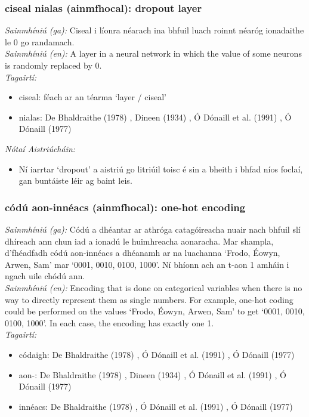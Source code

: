 \documentclass{article}
\begin{document}
\subsubsection*{ciseal nialas (ainmfhocal): dropout layer}
 \noindent \textit{Sainmhíniú (ga):} Ciseal i líonra néarach ina bhfuil luach roinnt néaróg ionadaithe le 0 go randamach.
\\
 \noindent \textit{Sainmhíniú (en):} A layer in a neural network in which the value of some neurons is randomly replaced by 0.
\\
 \noindent \textit{Tagairtí:}
\begin{itemize}
	\item ciseal: féach ar an téarma `layer / ciseal'
	\item nialas: De Bhaldraithe (1978) \cite{de-bhaldraithe}, Dineen (1934) \cite{dineen}, Ó Dónaill et al. (1991) \cite{focloir-beag}, Ó Dónaill (1977) \cite{odonaill}
\end{itemize}

 \noindent \textit{Nótaí Aistriúcháin:}
\begin{itemize}
	\item Ní iarrtar `dropout' a aistriú go litriúil toisc é sin a bheith i bhfad níos foclaí, gan buntáiste léir ag baint leis.
\end{itemize}


\subsubsection*{códú aon-innéacs (ainmfhocal): one-hot encoding}
 \noindent \textit{Sainmhíniú (ga):} Códú a dhéantar ar athróga catagóireacha nuair nach bhfuil slí dhíreach ann chun iad a ionadú le huimhreacha aonaracha. Mar shampla, d'fhéadfadh códú aon-innéacs a dhéanamh ar na luachanna `Frodo, Éowyn, Arwen, Sam' mar `0001, 0010, 0100, 1000'. Ní bhíonn ach an t-aon 1 amháin i ngach uile chódú ann.
\\
 \noindent \textit{Sainmhíniú (en):} Encoding that is done on categorical variables when there is no way to directly represent them as single numbers. For example, one-hot coding could be performed on the values `Frodo, Éowyn, Arwen, Sam' to get `0001, 0010, 0100, 1000'. In each case, the encoding has exactly one 1.
\\
 \noindent \textit{Tagairtí:}
\begin{itemize}
	\item códaigh: De Bhaldraithe (1978) \cite{de-bhaldraithe}, Ó Dónaill et al. (1991) \cite{focloir-beag}, Ó Dónaill (1977) \cite{odonaill}
	\item aon-: De Bhaldraithe (1978) \cite{de-bhaldraithe}, Dineen (1934) \cite{dineen}, Ó Dónaill et al. (1991) \cite{focloir-beag}, Ó Dónaill (1977) \cite{odonaill}
	\item innéacs: De Bhaldraithe (1978) \cite{de-bhaldraithe}, Ó Dónaill et al. (1991) \cite{focloir-beag}, Ó Dónaill (1977) \cite{odonaill}
\end{itemize}
\end{document}
